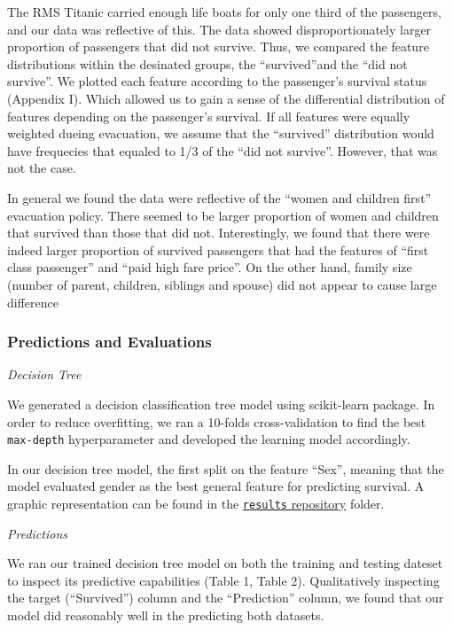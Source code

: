 \documentclass[]{article}
\begin{document}
The RMS Titanic carried enough life boats for only one third of the
passengers, and our data was reflective of this. The data showed
disproportionately larger proportion of passengers that did not survive.
Thus, we compared the feature distributions within the desinated groups,
the ``survived''and the ``did not survive''. We plotted each feature
according to the passenger's survival status (Appendix I). Which allowed
us to gain a sense of the differential distribution of features
depending on the passenger's survival. If all features were equally
weighted dueing evacuation, we assume that the ``survived'' distribution
would have frequecies that equaled to 1/3 of the ``did not survive''.
However, that was not the case.

In general we found the data were reflective of the ``women and children
first'' evacuation policy. There seemed to be larger proportion of women
and children that survived than those that did not. Interestingly, we
found that there were indeed larger proportion of survived passengers
that had the features of ``first class passenger'' and ``paid high fare
price''. On the other hand, family size (number of parent, children,
siblings and spouse) did not appear to cause large difference

\newpage

\subsubsection{Predictions and
Evaluations}\label{predictions-and-evaluations}

\emph{Decision Tree}

We generated a decision classification tree model using scikit-learn
package. In order to reduce overfitting, we ran a 10-folds
cross-validation to find the best \texttt{max-depth} hyperparameter and
developed the learning model accordingly.

In our decision tree model, the first split on the feature ``Sex'',
meaning that the model evaluated gender as the best general feature for
predicting survival. A graphic representation can be found in the
\href{https://github.com/UBC-MDS/sylvia_patrick_Titanic_Survival_ML/blob/master/results/decision_tree.png}{\texttt{results}
repository} folder.

\emph{Predictions}

We ran our trained decision tree model on both the training and testing
dateset to inspect its predictive capabilities (Table 1, Table 2).
Qualitatively inspecting the target (``Survived'') column and the
``Prediction'' column, we found that our model did reasonably well in
the predicting both datasets.
\end{document}
